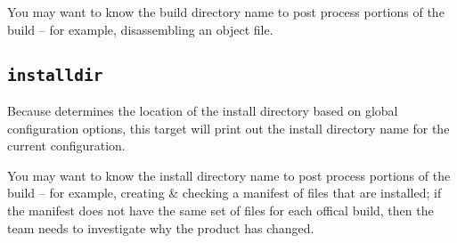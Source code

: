 You may want to know the build directory name to post process portions
of the build -- for example, disassembling an object file.

\subsection{\texttt{installdir}}

Because \lmsbw determines the location of the install directory based
on global configuration options, this target will print out the
install directory name for the current configuration.

You may want to know the install directory name to post process
portions of the build -- for example, creating \& checking a manifest
of files that are installed; if the manifest does not have the same
set of files for each offical build, then the \bni team needs to
investigate why the product has changed.


